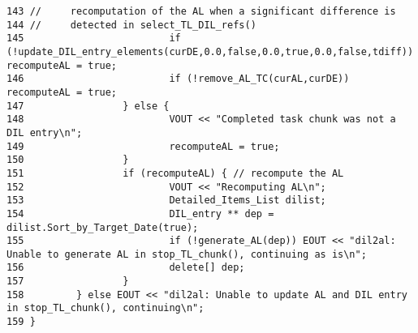 \begin{verbatim}
143 //     recomputation of the AL when a significant difference is
144 //     detected in select_TL_DIL_refs()
145                         if (!update_DIL_entry_elements(curDE,0.0,false,0.0,true,0.0,false,tdiff)) recomputeAL = true;
146                         if (!remove_AL_TC(curAL,curDE)) recomputeAL = true;
147                 } else {
148                         VOUT << "Completed task chunk was not a DIL entry\n";
149                         recomputeAL = true;
150                 }
151                 if (recomputeAL) { // recompute the AL
152                         VOUT << "Recomputing AL\n";
153                         Detailed_Items_List dilist;
154                         DIL_entry ** dep = dilist.Sort_by_Target_Date(true);
155                         if (!generate_AL(dep)) EOUT << "dil2al: Unable to generate AL in stop_TL_chunk(), continuing as is\n";
156                         delete[] dep;
157                 }
158         } else EOUT << "dil2al: Unable to update AL and DIL entry in stop_TL_chunk(), continuing\n";
159 }
\end{verbatim}\normalsize 
